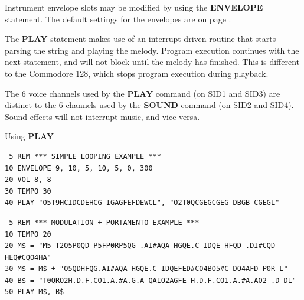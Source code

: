 \begin{description}[leftmargin=2cm,style=nextline]
                  Instrument envelope slots may be modified by using the {\bf ENVELOPE} statement. The default settings for the envelopes are on page \pageref{envelopetable}.

\item [Remarks:]  The {\bf PLAY} statement makes use of an interrupt driven routine that starts parsing the string and playing the melody. Program execution continues with the next statement, and will not block until the melody has finished. This is different to the Commodore 128, which stops program execution during playback.

                  The 6 voice channels used by the {\bf PLAY} command (on SID1 and SID3) are distinct to the 6 channels used by the {\bf SOUND} command (on SID2 and SID4). Sound effects will not interrupt music, and vice versa.

\item [Examples:] Using {\bf PLAY}

\begin{tcolorbox}[colback=black,coltext=white]
\verbatimfont{\codefont}
\begin{verbatim}
 5 REM *** SIMPLE LOOPING EXAMPLE ***
10 ENVELOPE 9, 10, 5, 10, 5, 0, 300
20 VOL 8, 8
30 TEMPO 30
40 PLAY "O5T9HCIDCDEHCG IGAGFEFDEWCL", "O2T0QCGEGCGEG DBGB CGEGL"
\end{verbatim}
\end{tcolorbox}

\begin{tcolorbox}[colback=black,coltext=white]
\verbatimfont{\codefont}
\begin{verbatim}
 5 REM *** MODULATION + PORTAMENTO EXAMPLE ***
10 TEMPO 20
20 M$ = "M5 T2O5P0QD P5FP0RP5QG .AI#AQA HGQE.C IDQE HFQD .DI#CQD HEQ#CQO4HA"
30 M$ = M$ + "O5QDHFQG.AI#AQA HGQE.C IDQEFED#CO4BO5#C DO4AFD P0R L"
40 B$ = "T0QRO2H.D.F.CO1.A.#A.G.A QAIO2AGFE H.D.F.CO1.A.#A.AO2 .D DL"
50 PLAY M$, B$
\end{verbatim}
\end{tcolorbox}
\end{description}


\newpage
